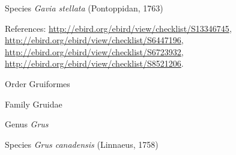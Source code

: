 \documentclass[9pt, article]{memoir}
\begin{document}
\begin{multicols}{2}
\vspace{6pt}\noindent\hspace{36pt}Species \textit{Gavia stellata} (Pontoppidan, 1763)


\vspace{6pt}References: 
\url{http://ebird.org/ebird/view/checklist/S13346745}, 
\url{http://ebird.org/ebird/view/checklist/S6447196}, 
\url{http://ebird.org/ebird/view/checklist/S6723932}, 
\url{http://ebird.org/ebird/view/checklist/S8521206}.

\vspace{6pt}\noindent\hspace{18pt}Order Gruiformes


\vspace{6pt}\noindent\hspace{24pt}Family Gruidae


\vspace{6pt}\noindent\hspace{30pt}Genus \textit{Grus}


\vspace{6pt}\noindent\hspace{36pt}Species \textit{Grus canadensis} (Linnaeus, 1758)



\end{multicols}
\end{document}

